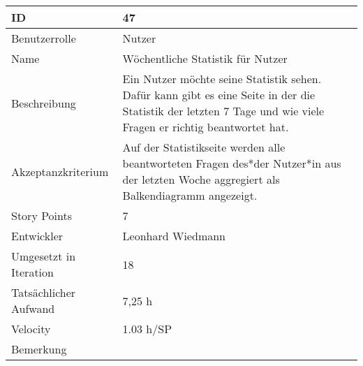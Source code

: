 \begin{tabularx}{\textwidth}{|p{}|X|}
	\hline
	ID & 47\\
	\hline
	Benutzerrolle & Nutzer\\
	\hline
	Name & Wöchentliche Statistik für Nutzer\\
	\hline
	Beschreibung & Ein Nutzer möchte seine Statistik sehen. Dafür kann gibt es eine Seite in der die Statistik der letzten 7 Tage und wie viele Fragen er richtig beantwortet hat.\\
	\hline
	Akzeptanzkriterium & Auf der Statistikseite werden alle beantworteten Fragen des*der Nutzer*in aus der letzten Woche aggregiert als Balkendiagramm angezeigt. \\
	\hline
	Story Points & 7\\
	\hline
	Entwickler & Leonhard Wiedmann \\
	\hline
	Umgesetzt in Iteration & 18\\
	\hline
	Tatsächlicher Aufwand & 7,25 h\\
	\hline
	Velocity & 1.03 h/SP \\
	\hline
	Bemerkung & \\
	\hline
\end{tabularx}
\vspace{20pt}
